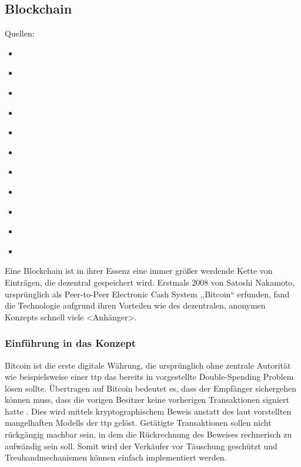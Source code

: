 \subsection{Blockchain}
\label{sec:sota_blockchain}

    Quellen:
    \begin{itemize}
        \item \cite{Dorri2016}
        \item \cite{Conoscenti2016}
        \item \cite{Greenspan2015}
        \item \cite{ISO307}
        \item \cite{Kshetri2017}
        \item \cite{Nakamoto2008}
        \item \cite{Underwood2016}
        \item \cite{Volulic2016}
        \item \cite{Volulic2017}
        \item \cite{Wuest2017}
        \item \cite{Zheng2017}
    \end{itemize}
    Eine Blockchain ist in ihrer Essenz eine immer größer werdende Kette von Einträgen, die dezentral gespeichert wird. 
    Erstmals 2008 von Satoshi Nakamoto, ursprünglich als Peer-to-Peer Electronic Cash System ,,Bitcoin`` erfunden, fand die Technologie aufgrund ihren Vorteilen wie des dezentralen, anonymen Konzepts schnell viele <Anhänger>. 
    
    \subsubsection{Einführung in das Konzept}
    \label{sec:sota_blockchain_introduction}
    Bitcoin ist die erste digitale Währung, die ursprünglich ohne zentrale Autorität wie beispielsweise einer \gls{ttp} das bereits in  vorgestellte Double-Spending Problem lösen sollte\cite{Nakamoto2008}. 
    Übertragen auf Bitcoin bedeutet es, dass der Empfänger sichergehen können muss, dass die vorigen Besitzer keine vorherigen Transaktionen signiert hatte \cite{Nakamoto2008}.
    Dies wird mittels kryptographischem Beweis anstatt des laut \citeauthor{Nakamoto2008} vorstellten mangelhaften Modells der \gls{ttp} gelöst.
    Getätigte Transaktionen sollen nicht rückgängig machbar sein, in dem die Rückrechnung des Beweises rechnerisch zu aufwändig sein soll\cite{Nakamoto2008}.
    Somit wird der Verkäufer vor Täuschung geschützt und Treuhandmechanismen können einfach implementiert werden\cite{Nakamoto2008}.  
    
